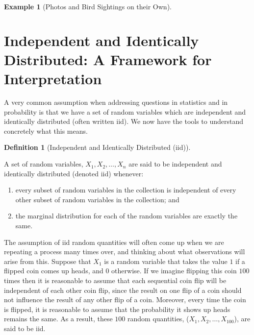 \documentclass[
  letterpaper,
  DIV=11,
  numbers=noendperiod]{scrreprt}
\providecommand{\tightlist}{%
  \setlength{\itemsep}{0pt}\setlength{\parskip}{0pt}}\usepackage{longtable,booktabs,array}
\theoremstyle{definition}
\theoremstyle{definition}
\newtheorem{example}{Example}[chapter]
\theoremstyle{definition}
\newtheorem{definition}{Definition}[chapter]
\theoremstyle{remark}
\begin{document}
\begin{example}[Photos and Bird Sightings on their
Own]
\begin{tcolorbox}[enhanced jigsaw, colback=white, colframe=quarto-callout-color-frame, arc=.35mm, leftrule=.75mm, rightrule=.15mm, opacityback=0, breakable, bottomrule=.15mm, left=2mm, toprule=.15mm]
\end{tcolorbox}

\end{example}

\section{Independent and Identically Distributed: A Framework for
Interpretation}\label{independent-and-identically-distributed-a-framework-for-interpretation}

A very common assumption when addressing questions in statistics and in
probability is that we have a set of random variables which are
independent and identically distributed (often written iid). We now have
the tools to understand concretely what this means.

\begin{definition}[Independent and Identically Distributed
(iid)]\protect\hypertarget{def-iid}{}\label{def-iid}

A set of random variables, \(X_1,X_2,\dots,X_n\) are said to be
independent and identically distributed (denoted iid) whenever:

\begin{enumerate}
\def\labelenumi{\roman{enumi}.}
\tightlist
\item
  every subset of random variables in the collection is independent of
  every other subset of random variables in the collection; and
\item
  the marginal distribution for each of the random variables are exactly
  the same.
\end{enumerate}

\end{definition}

The assumption of iid random quantities will often come up when we are
repeating a process many times over, and thinking about what
observations will arise from this. Suppose that \(X_1\) is a random
variable that takes the value \(1\) if a flipped coin comes up heads,
and \(0\) otherwise. If we imagine flipping this coin \(100\) times then
it is reasonable to assume that each sequential coin flip will be
independent of each other coin flip, since the result on one flip of a
coin should not influence the result of any other flip of a coin.
Moreover, every time the coin is flipped, it is reasonable to assume
that the probability it shows up heads remains the same. As a result,
these \(100\) random quantities, (\(X_1, X_2, \dots, X_{100}\)), are
said to be iid.
\end{document}
